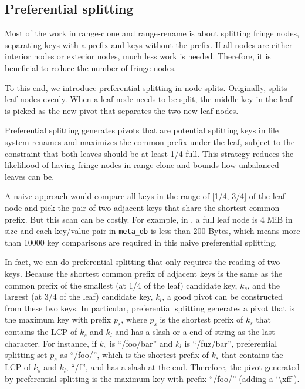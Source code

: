 \subsection{Preferential splitting}
\label{sec:rc:impl:pfsplit}

Most of the work in range-clone and range-rename is about splitting fringe
nodes, separating keys with a prefix and keys without the prefix.
If all nodes are either interior nodes or exterior nodes, much less work is
needed.
Therefore, it is beneficial to reduce the number of fringe nodes.

To this end, we introduce preferential splitting in node splits.
Originally, \fti splits leaf nodes evenly.
When a leaf node needs to be split, the middle key in the leaf is picked as the
new pivot that separates the two new leaf nodes.

Preferential splitting generates pivots that are potential splitting keys in
file system renames and maximizes the common prefix under the leaf,
subject to the constraint that both leaves should be at least 1/4 full.
This strategy reduces the likelihood of having fringe nodes
in range-clone and bounds how unbalanced leaves can be.

A naive approach would compare all keys in the range of [1/4, 3/4] of the leaf
node and pick the pair of two adjacent keys that share the shortest common
prefix.
But this scan can be costly.
For example, in \betrfs, a full leaf node is 4 MiB in size and each key/value pair in
\texttt{meta\_db} is less than 200 Bytes, which means more than 10000 key
comparisons are required in this naive preferential splitting.

In fact, we can do preferential splitting that only requires the reading of two keys.
Because the shortest common prefix of adjacent keys is the same as the common
prefix of the smallest (at 1/4 of the leaf) candidate key, $k_{s}$, and
the largest (at 3/4 of the leaf) candidate key, $k_{l}$,
a good pivot can be constructed from these two keys.
In particular, preferential splitting generates a pivot that is the maximum key
with prefix $p_{s}$, where $p_{s}$ is the shortest prefix of $k_{s}$ that
contains the LCP of $k_{s}$ and $k_{l}$ and has a slash or a end-of-string as
the last character.
For instance, if $k_{s}$ is ``/foo/bar'' and $k_{l}$ is ``/fuz/bar'',
preferential splitting set $p_{s}$ as ``/foo/'', which is the shortest prefix
of $k_{s}$ that contains the LCP of $k_{s}$ and $k_{l}$, ``/f'', and has a
slash at the end.
Therefore, the pivot generated by preferential splitting is the maximum key with
prefix ``/foo/'' (adding a `\textbackslash xff').

